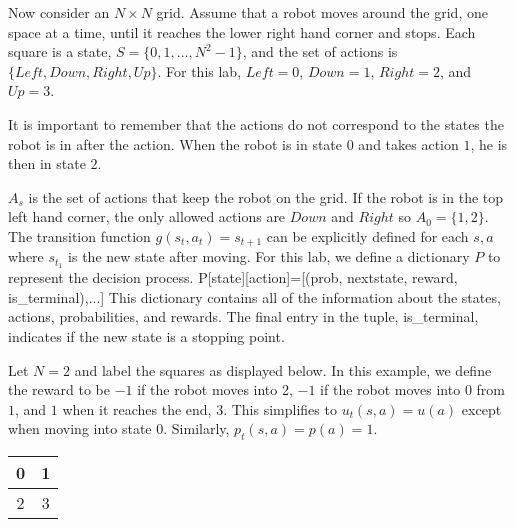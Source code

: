 Now consider an $N \times N$ grid.
Assume that a robot moves around the grid, one space at a time, until it reaches the lower right hand corner and stops.
Each square is a state, $S = \{0, 1, \ldots, N^2-1\}$, and the set of actions is $\{Left, Down, Right, Up\}$.
For this lab, $Left = 0$, $Down = 1$, $Right = 2$, and $Up = 3$.

\begin{warn}
It is important to remember that the actions do not correspond to the states the robot is in after the action.
When the robot is in state $0$ and takes action $1$, he is then in state $2$.
\end{warn}

$A_s$ is the set of actions that keep the robot on the grid.
If the robot is in the top left hand corner, the only allowed actions are $Down$ and $Right$ so $A_0 = \{1,2\}$.
The transition function $g(s_t,a_t) = s_{t+1}$ can be explicitly defined for each $s, a$ where $s_{t_1}$ is the new state after moving.
For this lab, we define a dictionary $P$ to represent the decision process.
P[state][action]=[(prob, nextstate, reward, is\_terminal),...]
This dictionary contains all of the information about the states, actions, probabilities, and rewards.
The final entry in the tuple, is\_terminal, indicates if the new state is a stopping point.

Let $N=2$ and label the squares as displayed below.
In this example, we define the reward to be $-1$ if the robot moves into 2, $-1$ if the robot moves into $0$ from $1$, and $1$ when it reaches the end, $3$.
This simplifies to $u_t(s,a) = u(a)$ except when moving into state $0$.
Similarly, $p_t(s,a) = p(a) = 1$.

\begin{center}
\begin{tabular}{|c|c|}
\hline
0 & 1 \\ \hline
\cellcolor{red!20}2 & \cellcolor{green!20}3 \\ \hline
\end{tabular}
\end{center}


